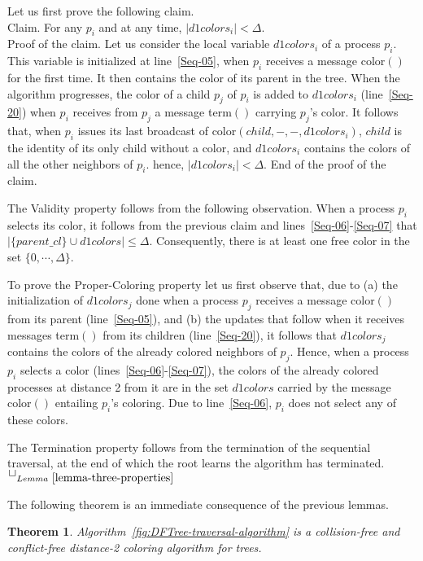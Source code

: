 \documentclass[11pt,english]{article}
\newcommand{\donecol}{\mathit{d1colors}}
\newtheorem{theorem}{Theorem}
\newcommand{\toto}{xxx}
\newenvironment{proofL}{\noindent{\bf
Proof }} {\hspace*{\fill}$\Box_{Lemma~\ref{\toto}}$\par\vspace{3mm}}
\begin{document}
\begin{proofL}
  Let us first prove the following claim. \\
  Claim. For any $p_i$ and  at any time, $|\donecol_i|<\Delta$. \\
  Proof of the claim.  Let us consider the local variable $\donecol_i$
  of a process $p_i$.  This variable is initialized at
  line~\ref{Seq-05}, when $p_i$ receives a message {\sc color}$()$ for
  the first time. It then contains the color of its parent in the
  tree. When the algorithm progresses, the color of a child $p_j$ of
  $p_i$ is added to $\donecol_i$ (line~\ref{Seq-20}) when $p_i$
  receives from $p_j$ a message {\sc term}$()$ carrying $p_j$'s color.
  It follows that, when $p_i$ issues its last broadcast of {\sc
    color}$(child,-,-,\donecol_i)$, $child$ is the identity of its
  only child without a color, and $\donecol_i$ contains the colors of
  all the other neighbors of $p_i$. hence, $|\donecol_i|<\Delta$. End
  of the proof of the claim.


The Validity property follows from the following observation.
When a process $p_i$ selects its color, it follows from the previous claim
and   lines~\ref{Seq-06}-\ref{Seq-07} that
$|\{parent\_cl\} \cup \donecol|\leq \Delta$. Consequently, 
there is at least one free color in the set $\{0,\cdots,\Delta\}$. 

To prove the Proper-Coloring property let us first observe that, due
to (a) the initialization of $\donecol_j$ done when a process $p_j$
receives a message {\sc color}$()$ from its parent
(line~\ref{Seq-05}), and (b) the updates that follow when it receives
messages {\sc term}$()$ from its children (line~\ref{Seq-20}), it
follows that $\donecol_j$ contains the colors of the already colored
neighbors of $p_j$.  Hence, when a process $p_i$ selects a color
(lines~\ref{Seq-06}-\ref{Seq-07}), the colors of the already colored
processes at distance 2 from it are in the set $\donecol$ carried by
the message {\sc color}$()$ entailing $p_i$'s coloring.  Due to
line~\ref{Seq-06}, $p_i$ does not select any of these colors.

The Termination property follows from the termination of the sequential 
traversal, at the end of which the root learns the algorithm has terminated. 
\renewcommand{\toto}{lemma-three-properties}
\end{proofL}

\noindent
The following theorem is an immediate consequence of the previous lemmas. 
\begin{theorem}
\label{theo:seq-traversal-coloring}
Algorithm~{\em\ref{fig:DFTree-traversal-algorithm}} 
is a collision-free and conflict-free distance-2 coloring algorithm for trees. 
\end{theorem}
\end{document}

